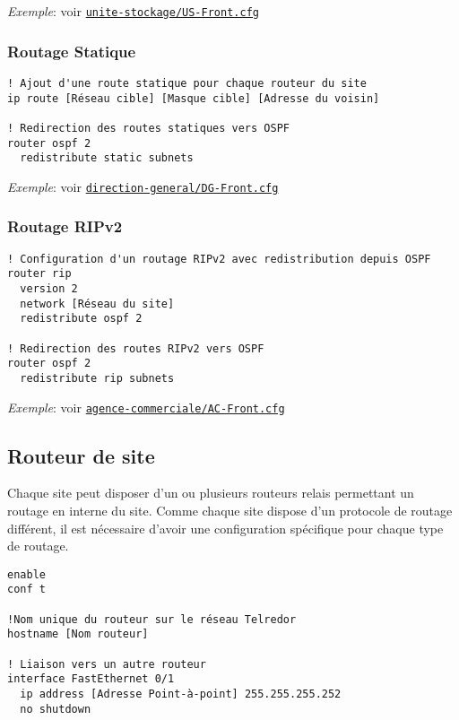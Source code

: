 \documentclass{article}
\newcommand{\seefile}[1]{
  \begin{center}
  \begin{minipage}{0.9\textwidth}
    \emph{Exemple}: voir \texttt{\href{https://github.com/EpicKiwi/Wide-Network-Project-Cesi-A4/blob/master/network/#1}{#1}}
  \end{minipage}
  \end{center}
}
\begin{document}
\seefile{unite-stockage/US-Front.cfg}

\subsubsection{Routage Statique}

\begin{lstlisting}[caption=Configuration d'un routeur "Front" avec routage statique]
! Ajout d'une route statique pour chaque routeur du site
ip route [Réseau cible] [Masque cible] [Adresse du voisin]

! Redirection des routes statiques vers OSPF
router ospf 2
  redistribute static subnets
\end{lstlisting}

\seefile{direction-general/DG-Front.cfg}

\subsubsection{Routage RIPv2}

\begin{lstlisting}[caption=Configuration d'un routeur "Front" avec RIPv2]
! Configuration d'un routage RIPv2 avec redistribution depuis OSPF
router rip
  version 2
  network [Réseau du site]
  redistribute ospf 2

! Redirection des routes RIPv2 vers OSPF
router ospf 2
  redistribute rip subnets
\end{lstlisting}

\seefile{agence-commerciale/AC-Front.cfg}

\subsection{Routeur de site}

Chaque site peut disposer d'un ou plusieurs routeurs relais permettant un routage en interne du site.
Comme chaque site dispose d'un protocole de routage différent, il est nécessaire d'avoir une configuration spécifique pour chaque type de routage.

\begin{lstlisting}[caption=Configuration de base d'un routeur de site]
enable
conf t

!Nom unique du routeur sur le réseau Telredor
hostname [Nom routeur]

! Liaison vers un autre routeur
interface FastEthernet 0/1
  ip address [Adresse Point-à-point] 255.255.255.252
  no shutdown
\end{lstlisting}
\end{document}
